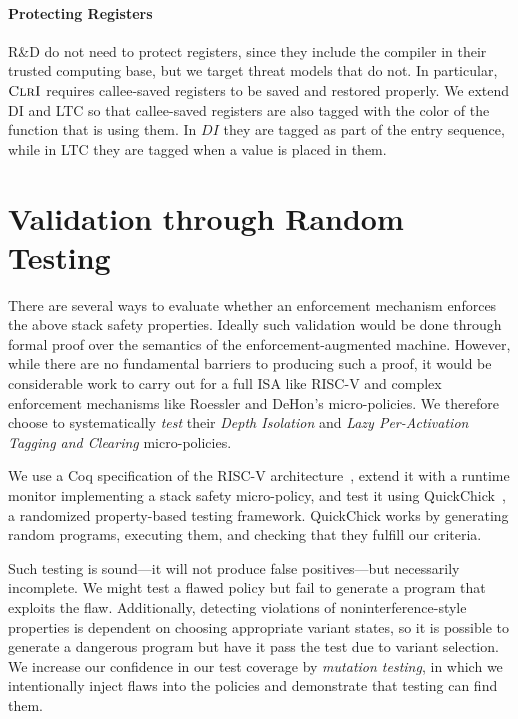 \documentclass[10pt,conference]{ieeetran}%
\theoremstyle{definition}
\begin{document}
\paragraph*{Protecting Registers}

R\&D do not need to protect registers, since they include the compiler in their
trusted computing base, but we target threat models that do not.
In particular, \(\textnormal{\sc ClrI}\) requires callee-saved
registers to be saved and restored properly. We extend DI and LTC
so that callee-saved registers are also tagged with the color of the
function that is using them. In \(DI\) they are tagged as part of the entry
sequence, while in LTC they are tagged when a value is placed in them.

\section{Validation through Random Testing}
\label{sec:testing}

There are several ways to evaluate whether an enforcement mechanism enforces the above
stack safety properties. Ideally such validation would be done through formal proof over
the semantics of the enforcement-augmented machine.
However, while there are no fundamental barriers to producing such a proof,
it would be considerable work to carry out for a full ISA like RISC-V and
complex enforcement mechanisms like Roessler and DeHon's micro-policies.
We therefore choose to systematically \emph{test} their {\em Depth Isolation}
and {\em Lazy Per-Activation Tagging and Clearing} micro-policies.

We use a Coq specification of the RISC-V architecture~\cite{Bourgeat2021AMF},
extend it with a runtime monitor implementing a stack safety micro-policy,
and test it using QuickChick~\cite{Pierce:SF4}, a randomized property-based
testing framework. QuickChick works by generating
random programs, executing them, and checking that they fulfill our criteria.

Such testing is sound---it will not produce false positives---but
necessarily incomplete. We might test a flawed policy but fail to generate a
program that exploits the flaw. Additionally, detecting violations of noninterference-style
properties is dependent on choosing appropriate variant states, so it is possible
to generate a dangerous program but have it pass the test due to variant selection.
We increase our confidence in our test coverage by {\em mutation testing},
in which we intentionally inject flaws into the policies and demonstrate that testing
can find them.
\end{document}
